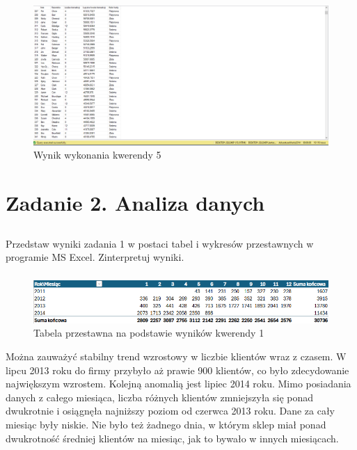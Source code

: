 \documentclass[a4paper,12pt]{article}
\begin{document}
\begin{figure}[H]
    \centering
    \includegraphics[width=1.0\textwidth]{images/05.png}
    \caption{Wynik wykonania kwerendy 5}
\end{figure}

\section{Zadanie 2. Analiza danych}

\subsection{}

Przedstaw wyniki zadania 1 w postaci tabel i wykresów przestawnych w programie MS Excel. Zinterpretuj wyniki.

\subsubsection{}

\begin{figure}[H]
    \centering
    \includegraphics[width=1.0\textwidth]{images/excel/01.png}
    \caption{Tabela przestawna na podstawie wyników kwerendy 1}
\end{figure}

Można zauważyć stabilny trend wzrostowy w liczbie klientów wraz z czasem. W lipcu 2013 roku do firmy przybyło aż prawie 900 klientów, co było zdecydowanie największym wzrostem. Kolejną anomalią jest lipiec 2014 roku. Mimo posiadania danych z całego miesiąca, liczba różnych klientów zmniejszyła się ponad dwukrotnie i osiągnęła najniższy poziom od czerwca 2013 roku. Dane za cały miesiąc były niskie. Nie było też żadnego dnia, w którym sklep miał ponad dwukrotność średniej klientów na miesiąc, jak to bywało w innych miesiącach.
\end{document}

